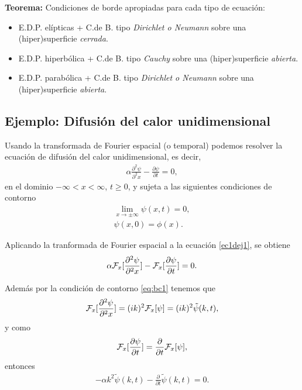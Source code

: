 \begin{tcolorbox}
\textbf{Teorema:} Condiciones de borde apropiadas para cada tipo de ecuación:

\begin{itemize}
\item E.D.P. elípticas +  C.de B. tipo \textit{Dirichlet o Neumann} sobre una (hiper)superficie \textit{cerrada}.
\item E.D.P. hiperbólica + C.de B. tipo \textit{Cauchy} sobre una (hiper)superficie \textit{abierta}.
\item E.D.P. parabólica + C.de B. tipo \textit{Dirichlet o Neumann} sobre una (hiper)superficie \textit{abierta}.
\end{itemize}
\end{tcolorbox}
\subsection{Ejemplo: Difusión del calor unidimensional}

Usando la transformada de Fourier espacial (o temporal) podemos resolver la ecuación de difusión del calor unidimensional, es decir,
\begin{align}\label{ec1dej1}
\alpha \frac{\partial^2 \psi}{\partial^2 x}-\frac{\partial \psi}{\partial t}=0,
\end{align}
en el dominio $-\infty<x<\infty$, $t\ge 0$, y sujeta a las siguientes condiciones de contorno
\begin{align}
\lim_{x \rightarrow \pm \infty}\psi(x,t)=0,\label{eq:bc1}\\
\psi(x,0)=\phi(x).\label{eq:bc2}
\end{align}

Aplicando la tranformada de Fourier espacial a la ecuación \eqref{ec1dej1}, se obtiene
\begin{align}
\alpha {\cal F}_{x}[\frac{\partial^2 \psi}{\partial^2 x}]-{\cal F}_{x}[\frac{\partial \psi}{\partial t}]=0.
\end{align}

Además por la condición de contorno \eqref{eq:bc1} tenemos que
\begin{align}
{\cal F}_{x}[\frac{\partial^2 \psi}{\partial^2 x}]=(i k)^2 {\cal F}_{x}[\psi]=(i k)^2 \tilde{\psi}(k,t),
\end{align}
y como
\begin{align}
{\cal F}_{x}[\frac{\partial \psi}{\partial t}]=\frac{\partial}{\partial t}{\cal F}_{x}[\psi],
\end{align}
entonces
\begin{align}
-\alpha k^2 \tilde{\psi}(k,t)-\frac{\partial}{\partial t}\tilde{\psi}(k,t)=0.
\end{align}

